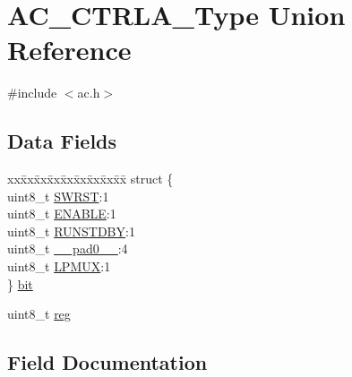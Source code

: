 \hypertarget{union_a_c___c_t_r_l_a___type}{}\section{A\+C\+\_\+\+C\+T\+R\+L\+A\+\_\+\+Type Union Reference}
\label{union_a_c___c_t_r_l_a___type}


{\ttfamily \#include $<$ac.\+h$>$}

\subsection*{Data Fields}
\begin{DoxyCompactItemize}
\item 
\begin{tabbing}
xx\=xx\=xx\=xx\=xx\=xx\=xx\=xx\=xx\=\kill
struct \{\\
\>uint8\_t \mbox{\hyperlink{union_a_c___c_t_r_l_a___type_a9334d5ac0548802c90a8129c52c8e490}{SWRST}}:1\\
\>uint8\_t \mbox{\hyperlink{union_a_c___c_t_r_l_a___type_a2b3662f1b123463ae1a23c1f324e5cc5}{ENABLE}}:1\\
\>uint8\_t \mbox{\hyperlink{union_a_c___c_t_r_l_a___type_aa24338c5cacc63e3b77adf2dc0938ff6}{RUNSTDBY}}:1\\
\>uint8\_t \mbox{\hyperlink{union_a_c___c_t_r_l_a___type_a8b4eebe79ded0459acec2f4950102ba3}{\_\_pad0\_\_}}:4\\
\>uint8\_t \mbox{\hyperlink{union_a_c___c_t_r_l_a___type_ade295e23183393f48d08879c919f2db9}{LPMUX}}:1\\
\} \mbox{\hyperlink{union_a_c___c_t_r_l_a___type_a2fad968b4372c0ca19e3b9d193399205}{bit}}\\

\end{tabbing}\item 
uint8\+\_\+t \mbox{\hyperlink{union_a_c___c_t_r_l_a___type_a9428adc9af4653a2050e2536b55dec8d}{reg}}
\end{DoxyCompactItemize}


\subsection{Field Documentation}
\mbox{\label{union_a_c___c_t_r_l_a___type_a8b4eebe79ded0459acec2f4950102ba3}} 
